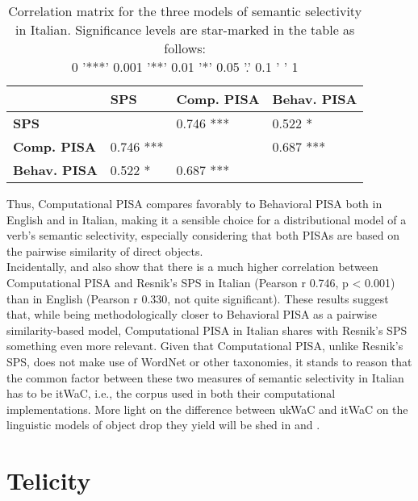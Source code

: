 \begin{table}[htb] %
\caption{Correlation matrix for the three models of semantic selectivity in Italian. Significance levels are star-marked in the table as follows:\\ 0 '***'  0.001 '**' 0.01 '*' 0.05 '.' 0.1 ' ' 1}
\begin{tabular}{l|lll}
      & \textbf{SPS}   & \textbf{Comp. PISA}    & \textbf{Behav. PISA}    \\
\hline
\textbf{SPS}   &       & 0.746 ***     & 0.522 *    \\
\textbf{Comp. PISA} & 0.746 ***  &          & 0.687 *** \\
\textbf{Behav. PISA} & 0.522 * & 0.687 *** &     
\end{tabular}
\end{table}

Thus, Computational PISA compares favorably to Behavioral PISA both in English and in Italian, making it a sensible choice for a distributional model of a verb's semantic selectivity, especially considering that both PISAs are based on the pairwise similarity of direct objects.\\
Incidentally,  and  also show that there is a much higher correlation between Computational PISA and Resnik's SPS in Italian (Pearson r 0.746, p < 0.001) than in English (Pearson r 0.330, not quite significant). These results suggest that, while being methodologically closer to Behavioral PISA as a pairwise similarity-based model, Computational PISA in Italian shares with Resnik's SPS something even more relevant. Given that Computational PISA, unlike Resnik's SPS, does not make use of WordNet or other taxonomies, it stands to reason that the common factor between these two measures of semantic selectivity in Italian has to be itWaC, i.e., the corpus used in both their computational implementations. More light on the difference between ukWaC and itWaC on the linguistic models of object drop they yield will be shed in  and .


\section{Telicity} 


